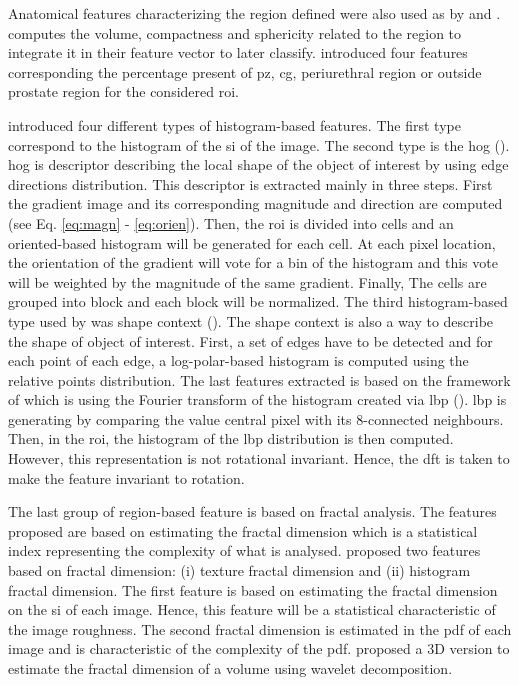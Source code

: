 \begin{enumerate}[leftmargin=*]
Anatomical features characterizing the region defined were also used as by \cite{Litjens2012} and \cite{Matulewicz2013}. \cite{Litjens2012} computes the volume, compactness and sphericity related to the region to integrate it in their feature vector to later classify. \cite{Matulewicz2013} introduced four features corresponding the percentage present of \ac{pz}, \ac{cg}, periurethral region or outside prostate region for the considered \ac{roi}.

\cite{Liu2013} introduced four different types of histogram-based features. The first type correspond to the histogram of the \ac{si} of the image. The second type is the \ac{hog} (\cite{Dalal2005}). \Ac{hog} is descriptor describing the local shape of the object of interest by using edge directions distribution. This descriptor is extracted mainly in three steps. First the gradient image and its corresponding magnitude and direction are computed (see Eq. \ref{eq:magn} - \ref{eq:orien}). Then, the \ac{roi} is divided into cells and an oriented-based histogram will be generated for each cell. At each pixel location, the orientation of the gradient will vote for a bin of the histogram and this vote will be weighted by the magnitude of the same gradient. Finally, The cells are grouped into block and each block will be normalized. The third histogram-based type used by \cite{Liu2013} was shape context (\cite{Belongie2002}). The shape context is also a way to describe the shape of object of interest. First, a set of edges have to be detected and for each point of each edge, a log-polar-based histogram is computed using the relative points distribution. The last features extracted is based on the framework of \cite{Zhao2012} which is using the Fourier transform of the histogram created via \ac{lbp} (\cite{Ojala1996}). \Ac{lbp} is generating by comparing the value central pixel with its 8-connected neighbours. Then, in the \ac{roi}, the histogram of the \ac{lbp} distribution is then computed. However, this representation is not rotational invariant. Hence, the \ac{dft} is taken to make the feature invariant to rotation.

The last group of region-based feature is based on fractal analysis. The features proposed are based on estimating the fractal dimension which is a statistical index representing the complexity of what is analysed. \cite{Lv2009} proposed two features based on fractal dimension: (i) texture fractal dimension and (ii) histogram fractal dimension. The first feature is based on estimating the fractal dimension on the \ac{si} of each image. Hence, this feature will be a statistical characteristic of the image roughness. The second fractal dimension is estimated in the \ac{pdf} of each image and is characteristic of the complexity of the \ac{pdf}. \cite{Lopes2011} proposed a 3D version to estimate the fractal dimension of a volume using wavelet decomposition.
\end{enumerate}

